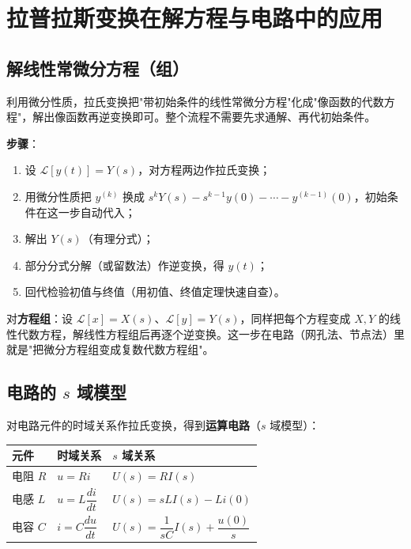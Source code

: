 \section{拉普拉斯变换在解方程与电路中的应用}

\subsection{解线性常微分方程（组）}

利用微分性质，拉氏变换把"带初始条件的线性常微分方程"化成"像函数的代数方程"，解出像函数再逆变换即可。整个流程不需要先求通解、再代初始条件。

\textbf{步骤}：
\begin{enumerate}
    \item 设 \(\mathscr{L}[y(t)]=Y(s)\)，对方程两边作拉氏变换；
    \item 用微分性质把 \(y^{(k)}\) 换成 \(s^kY(s)-s^{k-1}y(0)-\cdots-y^{(k-1)}(0)\)，初始条件在这一步自动代入；
    \item 解出 \(Y(s)\)（有理分式）；
    \item 部分分式分解（或留数法）作逆变换，得 \(y(t)\)；
    \item 回代检验初值与终值（用初值、终值定理快速自查）。
\end{enumerate}

对\textbf{方程组}：设 \(\mathscr{L}[x]=X(s)\)、\(\mathscr{L}[y]=Y(s)\)，同样把每个方程变成 \(X,Y\) 的线性代数方程，解线性方程组后再逐个逆变换。这一步在电路（网孔法、节点法）里就是"把微分方程组变成复数代数方程组"。

\subsection{电路的 \(s\) 域模型}

对电路元件的时域关系作拉氏变换，得到\textbf{运算电路}（\(s\) 域模型）：

\begin{center}
\begin{tabular}{@{}lll@{}}
\toprule
元件 & 时域关系 & \(s\) 域关系 \\
\midrule
电阻 \(R\) & \(u=Ri\) & \(U(s)=RI(s)\) \\
电感 \(L\) & \(u=L\dfrac{di}{dt}\) & \(U(s)=sLI(s)-Li(0)\) \\
电容 \(C\) & \(i=C\dfrac{du}{dt}\) & \(U(s)=\dfrac{1}{sC}I(s)+\dfrac{u(0)}{s}\) \\
\bottomrule
\end{tabular}
\end{center}

